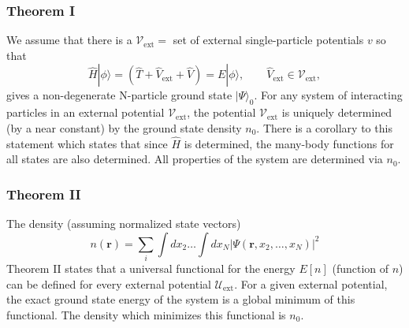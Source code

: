 \documentclass[compress]{beamer}
\newcommand*{\ket}[1]{|#1\rangle}
\begin{document}
\frame
{
  \frametitle{Theorem I}
\begin{small}
{\scriptsize
We assume that there is a
$\mathcal{V}_{\mathrm{ext}} =$ set of external single-particle \alert{potentials} $v$ so that
\begin{equation}
\hat{H}\ket{\phi} = \left(\hat{T}+\hat{V}_{\mathrm{ext}}+\hat{V}\right)=E\ket{\phi},\qquad \hat{V}_{\mathrm{ext}}\in \mathcal{V}_{\mathrm{ext}},\nonumber
\end{equation} 
gives a \alert{non-degenerate} N-particle ground state $\ket{\Psi }_0$.
For any system of interacting particles in an external potential 
$\mathcal{V}_{\mathrm{ext}}$, the potential $\mathcal{V}_{\mathrm{ext}}$ is uniquely 
determined (by a near constant) by the ground state density $n_0$.
There is a corollary to this statement which states that since $\hat{H}$ is determined, the many-body functions for all states are also determined. All properties of the system are determined via $n_0$.
}
\end{small}
}


\frame
{
  \frametitle{Theorem II}
\begin{small}
{\scriptsize
The density (assuming normalized state vectors)
\begin{equation}
  n(\mathbf{r})=\sum_{i}\int dx_{2}\dots \int dx_{N}\vert \Psi(\mathbf{r},x_{2},\dots ,x_{N})\vert^{2} \nonumber
\end{equation}
Theorem II states that a universal functional for the energy $E[n]$ (function of $n$) can be defined for every external potential
$\mathcal{U}_{\mathrm{ext}}$. For a given external potential, the exact ground state energy of the system is a global minimum of this functional. The density which minimizes this functional is $n_0$.
}
\end{small}
}
\end{document}
